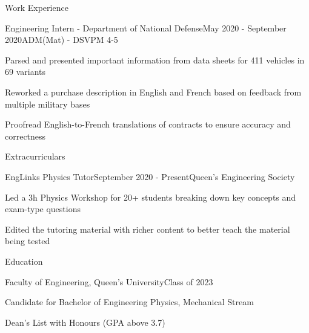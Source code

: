 \documentclass{resume} %
\begin{document}
\begin{rSection}{Work Experience}
\begin{rSubsection}{Engineering Intern - Department of National Defense}{May 2020 - September 2020}{ADM(Mat) - DSVPM 4-5}{}

\item Parsed and presented important information from data sheets for 411 vehicles in 69 variants
\item Reworked a purchase description in English and French based on feedback from multiple military bases
\item Proofread English-to-French translations of contracts to ensure accuracy and correctness

\end{rSubsection}
\end{rSection}



\begin{rSection}{Extracurriculars}
\begin{rSubsection}{EngLinks Physics Tutor}{September 2020 - Present}{Queen's Engineering Society}{}
\item Led a 3h Physics Workshop for 20+ students breaking down key concepts and exam-type questions
\item Edited the tutoring material with richer content to better teach the material being tested

\end{rSubsection}

\end{rSection}


\begin{rSection}{Education}

\begin{rSubsection}{Faculty of Engineering, Queen's University}{Class of 2023}{}{}
\item Candidate for Bachelor of Engineering Physics, Mechanical Stream
\item Dean's List with Honours (GPA above 3.7)
\end{rSubsection}
\end{rSection}
\end{document}
